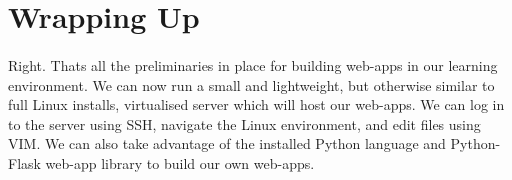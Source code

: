 \documentclass[12pt, a4paper, oneside]{book}
\begin{document}
\section{Wrapping Up}
\label{chapter_02_wrap-up}
\paragraph{} Right. Thats all the preliminaries in place for building web-apps in our learning environment. We can now run a small and lightweight, but otherwise similar to full Linux installs, virtualised server which will host our web-apps. We can log in to the server using SSH, navigate the Linux environment, and edit files using VIM. We can also take advantage of the installed Python language and Python-Flask web-app library to build our own web-apps.
\end{document}
